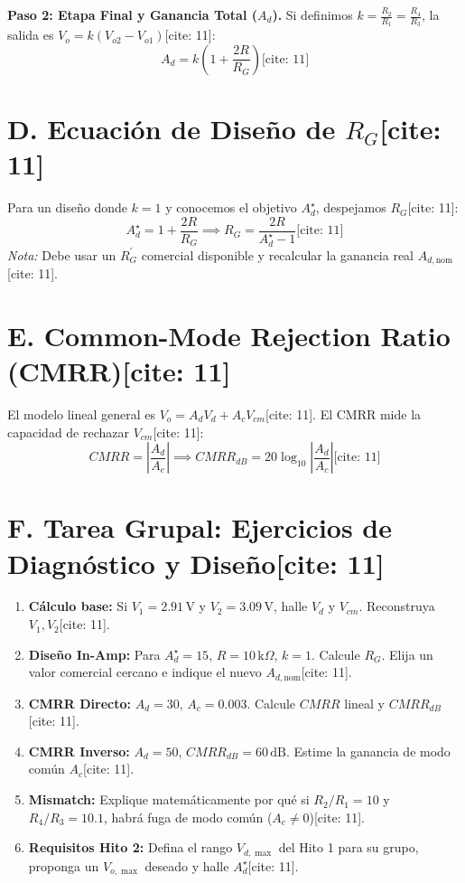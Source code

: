 \documentclass[11pt, a4paper]{article}
\begin{document}
\textbf{Paso 2: Etapa Final y Ganancia Total ($A_d$).} Si definimos $k = \frac{R_2}{R_1} = \frac{R_4}{R_3}$, la salida es $V_o = k(V_{o2} - V_{o1})$[cite: 11]:
\begin{equation}
    A_d = k\left(1 + \frac{2R}{R_G}\right) \text{[cite: 11]}
\end{equation}

\section*{D. Ecuación de Diseño de $R_G$[cite: 11]}
Para un diseño donde $k=1$ y conocemos el objetivo $A_d^\star$, despejamos $R_G$[cite: 11]:
\begin{equation}
    A_d^\star = 1 + \frac{2R}{R_G} \implies \boxed{ R_G = \frac{2R}{A_d^\star - 1} } \text{[cite: 11]}
\end{equation}
\textit{Nota:} Debe usar un $R_G^\prime$ comercial disponible y recalcular la ganancia real $A_{d,\mathrm{nom}}$[cite: 11].

\section*{E. Common-Mode Rejection Ratio (CMRR)[cite: 11]}
El modelo lineal general es $V_o = A_d V_d + A_c V_{cm}$[cite: 11]. El CMRR mide la capacidad de rechazar $V_{cm}$[cite: 11]:
\begin{equation}
    CMRR = \left| \frac{A_d}{A_c} \right| \implies CMRR_{dB} = 20\log_{10} \left| \frac{A_d}{A_c} \right| \text{[cite: 11]}
\end{equation}

\section*{F. Tarea Grupal: Ejercicios de Diagnóstico y Diseño[cite: 11]}
\begin{enumerate}
    \setlength{\itemsep}{0pt}
    \item \textbf{Cálculo base:} Si $V_1 = 2.91\,\text{V}$ y $V_2 = 3.09\,\text{V}$, halle $V_d$ y $V_{cm}$. Reconstruya $V_1, V_2$[cite: 11].
    \item \textbf{Diseño In-Amp:} Para $A_d^\star = 15$, $R=10\,\text{k}\Omega$, $k=1$. Calcule $R_G$. Elija un valor comercial cercano e indique el nuevo $A_{d,\mathrm{nom}}$[cite: 11].
    \item \textbf{CMRR Directo:} $A_d = 30$, $A_c = 0.003$. Calcule $CMRR$ lineal y $CMRR_{dB}$[cite: 11].
    \item \textbf{CMRR Inverso:} $A_d = 50$, $CMRR_{dB} = 60\,\text{dB}$. Estime la ganancia de modo común $A_c$[cite: 11].
    \item \textbf{Mismatch:} Explique matemáticamente por qué si $R_2/R_1 = 10$ y $R_4/R_3 = 10.1$, habrá fuga de modo común ($A_c \neq 0$)[cite: 11].
    \item \textbf{Requisitos Hito 2:} Defina el rango $V_{d,\max}$ del Hito 1 para su grupo, proponga un $V_{o,\max}$ deseado y halle $A_d^\star$[cite: 11].
\end{enumerate}
\end{document}

